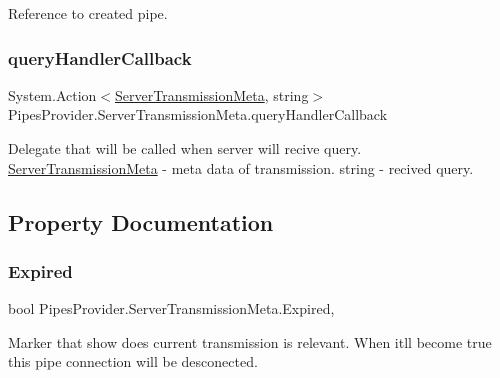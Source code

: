 Reference to created pipe. 

\mbox{\label{class_pipes_provider_1_1_server_transmission_meta_aa663870a4d61945bcedd85721ede42a5}} 
\subsubsection{\texorpdfstring{query\+Handler\+Callback}{queryHandlerCallback}}
{\footnotesize\ttfamily System.\+Action$<$\mbox{\hyperlink{class_pipes_provider_1_1_server_transmission_meta}{Server\+Transmission\+Meta}}, string$>$ Pipes\+Provider.\+Server\+Transmission\+Meta.\+query\+Handler\+Callback}



Delegate that will be called when server will recive query. \mbox{\hyperlink{class_pipes_provider_1_1_server_transmission_meta}{Server\+Transmission\+Meta}} -\/ meta data of transmission. string -\/ recived query. 



\subsection{Property Documentation}
\mbox{\label{class_pipes_provider_1_1_server_transmission_meta_acdc3e400b26c044443a9c3ce367433f4}} 
\subsubsection{\texorpdfstring{Expired}{Expired}}
{\footnotesize\ttfamily bool Pipes\+Provider.\+Server\+Transmission\+Meta.\+Expired\hspace{0.3cm}{\ttfamily [get]}, {}}



Marker that show does current transmission is relevant. When it\textquotesingle{}ll become true this pipe connection will be desconected. 

